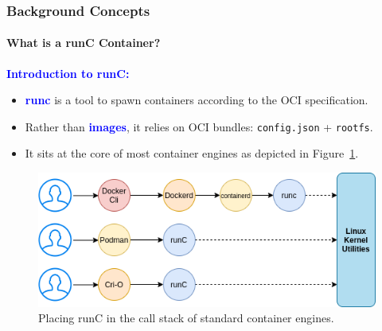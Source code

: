 \documentclass[9pt,    %
    english,            %
    xcolor=table,       %
    envcountsect,        %
    aspectratio=169     %
]{beamer}
\begin{document}
\begin{frame}
    \frametitle{Background Concepts}
    \framesubtitle{What is a runC Container?}

    \textbf{\textcolor{blue}{Introduction to runC:}}
    \begin{itemize}
        \item \textbf{\textcolor{blue}{runc}} is a tool to spawn containers according to the OCI specification.
        \item Rather than \textbf{\textcolor{blue}{images}}, it relies on OCI bundles: \texttt{config.json} + \texttt{rootfs}.
        \item It sits at the core of most container engines as depicted in Figure~\ref{fig:runc}.
    \end{itemize}

    \begin{figure}[h!]
        \includegraphics[width=.5\textwidth]{./images/runc.png}
        \caption{Placing runC in the call stack of standard container engines.\label{fig:runc}}
    \end{figure}
\end{frame}
\end{document}
